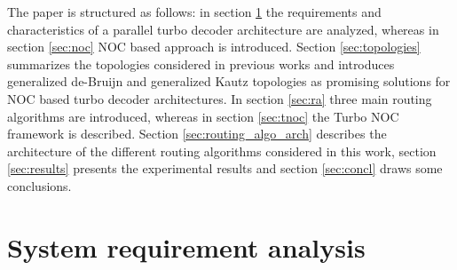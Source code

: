 \documentclass[10pt,twocolumn,journal]{IEEEtran}
\begin{document}
The paper is structured as follows: in section \ref{sec:system_analysis} the requirements and characteristics of a
parallel turbo decoder architecture are analyzed, whereas in section \ref{sec:noc} NOC based approach is 
introduced. Section \ref{sec:topologies} summarizes the topologies considered in previous works and introduces generalized 
de-Bruijn and generalized Kautz topologies as promising solutions for NOC based turbo decoder architectures. 
In section \ref{sec:ra} three main routing algorithms are introduced, whereas in section \ref{sec:tnoc} the Turbo NOC 
framework is described. Section \ref{sec:routing_algo_arch} describes the architecture of the different routing algorithms 
considered in this work, section \ref{sec:results} presents the experimental results and section \ref{sec:concl} draws 
some conclusions.

\section{System requirement analysis}
\label{sec:system_analysis}
\end{document}
